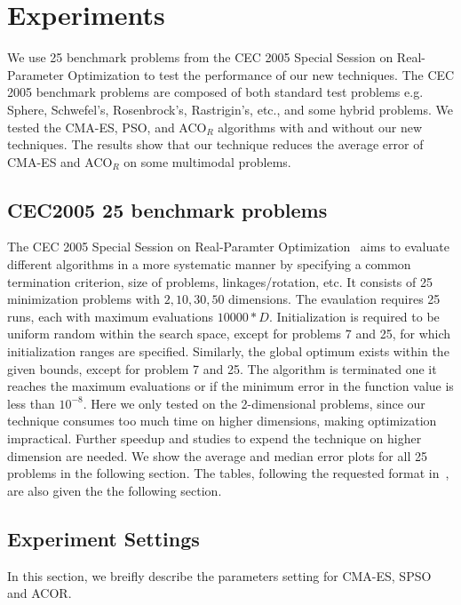 \chapter{Experiments}
\label{chapter:experiments}

We use 25 benchmark problems from the CEC 2005 Special Session on Real-Parameter Optimization to test the performance of our new techniques.
The CEC 2005 benchmark problems are composed of both standard test problems e.g. Sphere, Schwefel's, Rosenbrock's, Rastrigin's, etc.,
and some hybrid problems.
We tested the CMA-ES, PSO, and ACO$_R$ algorithms with and without our new techniques.
The results show that our technique reduces the average error of CMA-ES and ACO$_R$ on some multimodal problems.  

\section{CEC2005 25 benchmark problems}

The CEC 2005 Special Session on Real-Paramter Optimization~\cite{Suganthan:2005:benchmark} aims to evaluate different algorithms in a more systematic manner by specifying a common termination criterion, size of problems, linkages/rotation, etc.
It consists of 25 minimization problems with $2, 10, 30, 50$ dimensions.
The evaulation requires 25 runs, each with maximum evaluations $10000 * D$. 
Initialization is required to be uniform random within the search space, except for problems 7 and 25, for which initialization ranges are specified.
Similarly, the global optimum exists within the given bounds, except for problem 7 and 25.
The algorithm is terminated one it reaches the maximum evaluations or if the minimum error in the function value is less than $10^{-8}$.
Here we only tested on the 2-dimensional problems, 
since our technique consumes too much time on higher dimensions, 
making optimization impractical.  
Further speedup and studies to expend the technique on higher dimension are needed.
We show the average and median error plots for all 25 problems in the following section.
The tables, following the requested format in~\cite{Suganthan:2005:benchmark}, are also given the the following section.  


\section{Experiment Settings}

In this section, we breifly describe the parameters setting for CMA-ES, SPSO and ACOR.

